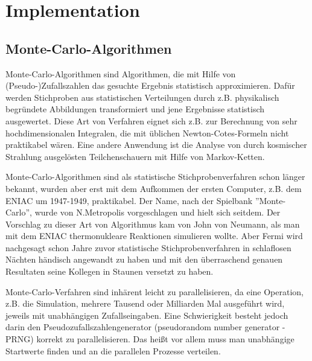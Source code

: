
\chapter{Implementation}
\label{sct:implementation}


\section{Monte-Carlo-Algorithmen}
\label{sct:montecarloalgo}

Monte-Carlo-Algorithmen sind Algorithmen, die mit Hilfe von (Pseudo-)Zufallszahlen das gesuchte Ergebnis statistisch approximieren. Dafür werden Stichproben aus statistischen Verteilungen durch z.B. physikalisch begründete Abbildungen transformiert und jene Ergebnisse statistisch ausgewertet. Diese Art von Verfahren eignet sich z.B. zur Berechnung von sehr hochdimensionalen Integralen, die mit üblichen Newton-Cotes-Formeln nicht praktikabel wären. Eine andere Anwendung ist die Analyse von durch kosmischer Strahlung ausgelösten Teilchenschauern mit Hilfe von Markov-Ketten\cite{metropolis1949monte}.

Monte-Carlo-Algorithmen sind als statistische Stichprobenverfahren schon länger bekannt, wurden aber erst mit dem Aufkommen der ersten Computer, z.B. dem ENIAC um 1947-1949, praktikabel\cite{metropolis1987beginning}. Der Name, nach der Spielbank ''Monte-Carlo'', wurde von N.Metropolis vorgeschlagen und hielt sich seitdem. Der Vorschlag zu dieser Art von Algorithmus kam von John von Neumann, als man mit dem ENIAC thermonukleare Reaktionen simulieren wollte. Aber Fermi wird nachgesagt schon Jahre zuvor statistische Stichprobenverfahren in schlaflosen Nächten händisch angewandt zu haben und mit den überraschend genauen Resultaten seine Kollegen in Staunen versetzt zu haben.

Monte-Carlo-Verfahren sind inhärent leicht zu parallelisieren, da eine Operation, z.B. die Simulation, mehrere Tausend oder Milliarden Mal ausgeführt wird, jeweils mit unabhängigen Zufallseingaben. Eine Schwierigkeit besteht jedoch darin den Pseudozufallszahlengenerator (pseudorandom number generator - PRNG) korrekt zu parallelisieren. Das heißt vor allem muss man unabhängige Startwerte finden und an die parallelen Prozesse verteilen.

